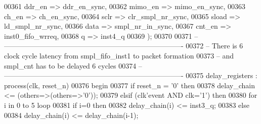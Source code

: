 \begin{DoxyCode}
00361       ddr_en      => ddr_en_sync,
00362       mimo_en     => mimo_en_sync,
00363       ch_en       => ch_en_sync,
00364       sclr        => clr_smpl_nr_sync,
00365       sload       => ld_smpl_nr_sync,
00366       data        => smpl_nr_in_sync,
00367       cnt_en      => inst0_fifo_wrreq,
00368       q           => inst4_q        
00369         \textcolor{vhdlchar}{)};
00370 
00371 \textcolor{keyword}{-- ----------------------------------------------------------------------------}
00372 \textcolor{keyword}{-- There is 6 clock cycle latency from smpl\_fifo\_inst1 to packet formation}
00373 \textcolor{keyword}{-- and smpl\_cnt has to be delayed 6 cycles}
00374 \textcolor{keyword}{-- ----------------------------------------------------------------------------        }
00375 delay\_registers : \textcolor{keywordflow}{process}(clk, reset_n)
00376 \textcolor{vhdlkeyword}{begin}
00377    \textcolor{keywordflow}{if} \textcolor{vhdlchar}{reset_n} \textcolor{vhdlchar}{=} \textcolor{vhdlchar}{'}\textcolor{vhdllogic}{}\textcolor{vhdllogic}{0}\textcolor{vhdlchar}{'} \textcolor{keywordflow}{then} 
00378       \textcolor{vhdlchar}{delay_chain} \textcolor{vhdlchar}{<=} \textcolor{vhdlchar}{(}\textcolor{keywordflow}{others}\textcolor{vhdlchar}{=}\textcolor{vhdlchar}{>}\textcolor{vhdlchar}{(}\textcolor{keywordflow}{others}\textcolor{vhdlchar}{=}\textcolor{vhdlchar}{>}\textcolor{vhdlchar}{'}\textcolor{vhdllogic}{}\textcolor{vhdllogic}{0}\textcolor{vhdlchar}{'}\textcolor{vhdlchar}{)}\textcolor{vhdlchar}{)};
00379    \textcolor{keywordflow}{elsif} \textcolor{vhdlchar}{(}\textcolor{vhdlchar}{clk}\textcolor{vhdlchar}{'}\textcolor{vhdlkeyword}{event} \textcolor{keywordflow}{AND} \textcolor{vhdlchar}{clk}\textcolor{vhdlchar}{=}\textcolor{vhdlchar}{'}\textcolor{vhdllogic}{}\textcolor{vhdllogic}{1}\textcolor{vhdlchar}{'}\textcolor{vhdlchar}{)} \textcolor{keywordflow}{then} 
00380       \textcolor{keywordflow}{for} \textcolor{vhdlchar}{i} \textcolor{keywordflow}{in} \textcolor{vhdllogic}{}\textcolor{vhdllogic}{0} \textcolor{keywordflow}{to} \textcolor{vhdllogic}{}\textcolor{vhdllogic}{5} \textcolor{keywordflow}{loop}
00381          \textcolor{keywordflow}{if} \textcolor{vhdlchar}{i}\textcolor{vhdlchar}{=}\textcolor{vhdllogic}{}\textcolor{vhdllogic}{0} \textcolor{keywordflow}{then} 
00382             \textcolor{vhdlchar}{delay_chain}\textcolor{vhdlchar}{(}\textcolor{vhdlchar}{i}\textcolor{vhdlchar}{)} \textcolor{vhdlchar}{<=} \textcolor{vhdlchar}{inst3_q};
00383          \textcolor{keywordflow}{else} 
00384             \textcolor{vhdlchar}{delay_chain}\textcolor{vhdlchar}{(}\textcolor{vhdlchar}{i}\textcolor{vhdlchar}{)} \textcolor{vhdlchar}{<=} \textcolor{vhdlchar}{delay_chain}\textcolor{vhdlchar}{(}\textcolor{vhdlchar}{i}\textcolor{vhdlchar}{-}\textcolor{vhdllogic}{}\textcolor{vhdllogic}{1}\textcolor{vhdlchar}{)};

\end{DoxyCode}
